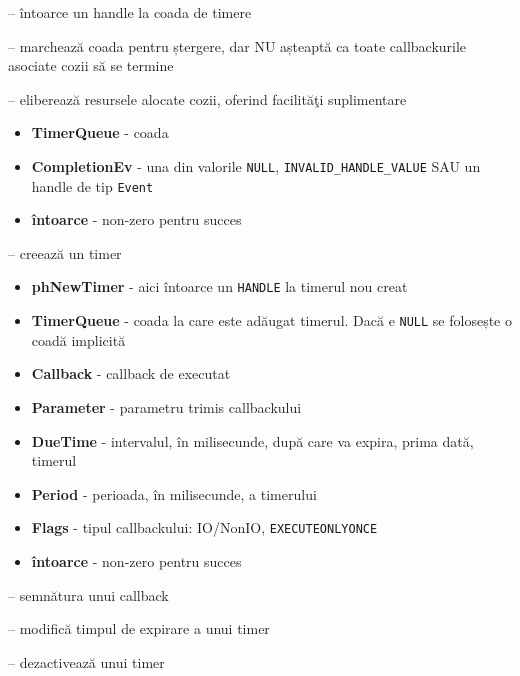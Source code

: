 \documentclass{refcard.cs.pub.ro}
\begin{document}
\begin{multicols*}{3}
 -- întoarce un handle la coada de timere

 -- marchează coada pentru ștergere, dar NU așteaptă ca toate
callbackurile asociate cozii să se termine

 -- eliberează resursele alocate cozii, oferind
facilităţi suplimentare
\begin{itemize}
  \item \textbf{TimerQueue} - coada
  \item \textbf{CompletionEv} - una din valorile \texttt{NULL}, \texttt{INVALID_HANDLE_VALUE} SAU un handle de tip
\texttt{Event}
  \item \textbf{întoarce} - non-zero pentru succes
\end{itemize}


 -- creează un timer
\begin{itemize}
  \item \textbf{phNewTimer} - aici întoarce un \texttt{HANDLE} la timerul nou creat
  \item \textbf{TimerQueue} - coada la care este adăugat timerul. Dacă e \texttt{NULL} se folosește o coadă implicită
  \item \textbf{Callback} - callback de executat
  \item \textbf{Parameter} - parametru trimis callbackului 
  \item \textbf{DueTime} - intervalul, în milisecunde, după care va expira, prima dată, timerul
  \item \textbf{Period} - perioada, în milisecunde, a timerului
  \item \textbf{Flags} - tipul callbackului: IO/NonIO, \texttt{EXECUTEONLYONCE}
  \item \textbf{întoarce} - non-zero pentru succes
\end{itemize}


 -- semnătura unui callback

 -- modifică timpul de expirare a unui timer

 -- dezactivează unui timer


\end{multicols*}
\end{document}

